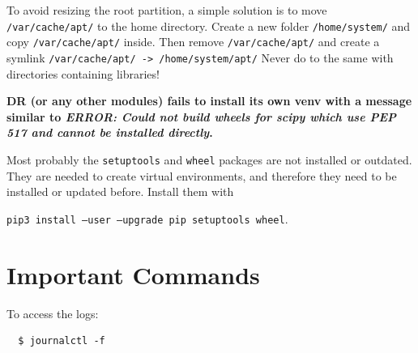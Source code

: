 \documentclass[a4paper,12pt]{article}
\begin{document}
To avoid resizing the root partition, a simple solution is to move {\tt /var/cache/apt/} to the home directory.
Create a new folder {\tt /home/system/} and copy {\tt /var/cache/apt/} inside. Then remove {\tt /var/cache/apt/} and create a symlink {\tt /var/cache/apt/ -> /home/system/apt/}
Never do to the same with directories containing libraries!

\textbf{DR (or any other modules) fails to install its own venv with a message similar to \emph{ERROR: Could not build wheels for scipy which use PEP 517 and cannot be installed directly}.}

Most probably the {\tt setuptools} and {\tt wheel} packages are not installed or outdated. They are needed to create virtual environments, and therefore they need to be installed or updated before. Install them with

{\tt pip3 install --user --upgrade pip setuptools wheel}.






\section{Important Commands}
To access the logs:

\begin{verbatim}
  $ journalctl -f
\end{verbatim}
\end{document}
